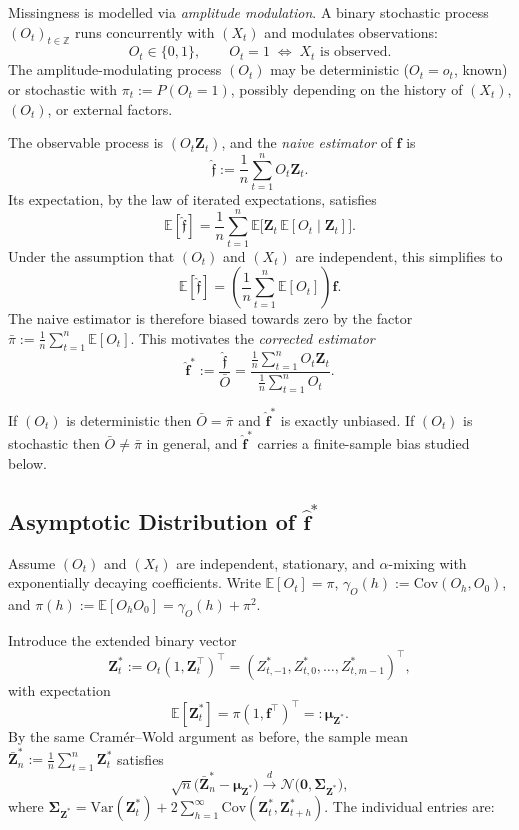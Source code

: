 \documentclass[12pt,a4paper]{scrreprt}
\begin{document}
Missingness is modelled via \emph{amplitude modulation}. A binary stochastic process
$(O_t)_{t \in \mathbb{Z}}$ runs concurrently with $(X_t)$ and modulates observations:
\[
    O_t \in \{0,1\}, \qquad O_t = 1 \;\Leftrightarrow\; X_t \text{ is observed}.
\]
The amplitude-modulating process $(O_t)$ may be deterministic ($O_t = o_t$, known) or
stochastic with $\pi_t := P(O_t = 1)$, possibly depending on the history of $(X_t)$, $(O_t)$,
or external factors.

The observable process is $(O_t\mathbf{Z}_t)$, and the \emph{naive estimator} of $\mathbf{f}$ is
\[
    \hat{\mathfrak{f}} := \frac{1}{n}\sum_{t=1}^{n} O_t\mathbf{Z}_t.
\]
Its expectation, by the law of iterated expectations, satisfies
\[
    \mathbb{E}[\hat{\mathfrak{f}}]
    = \frac{1}{n}\sum_{t=1}^{n} \mathbb{E}\bigl[\mathbf{Z}_t\,\mathbb{E}[O_t \mid \mathbf{Z}_t]\bigr].
\]
Under the assumption that $(O_t)$ and $(X_t)$ are independent, this simplifies to
\[
    \mathbb{E}[\hat{\mathfrak{f}}]
    = \left(\frac{1}{n}\sum_{t=1}^{n}\mathbb{E}[O_t]\right)\mathbf{f}.
\]
The naive estimator is therefore biased towards zero by the factor
$\bar{\pi} := \tfrac{1}{n}\sum_{t=1}^n \mathbb{E}[O_t]$. This motivates the \emph{corrected
estimator}
\[
    \hat{\mathbf{f}}^{*} := \frac{\hat{\mathfrak{f}}}{\bar{O}}
    = \frac{\tfrac{1}{n}\sum_{t=1}^{n} O_t\mathbf{Z}_t}{\tfrac{1}{n}\sum_{t=1}^{n}O_t}.
\]

If $(O_t)$ is deterministic then $\bar{O} = \bar{\pi}$ and $\hat{\mathbf{f}}^{*}$ is exactly
unbiased. If $(O_t)$ is stochastic then $\bar{O} \neq \bar{\pi}$ in general, and
$\hat{\mathbf{f}}^{*}$ carries a finite-sample bias studied below.

\subsection{Asymptotic Distribution of \texorpdfstring{$\hat{\mathbf{f}}^{*}$}{f*-hat}}

Assume $(O_t)$ and $(X_t)$ are independent, stationary, and $\alpha$-mixing with exponentially
decaying coefficients. Write $\mathbb{E}[O_t] = \pi$, $\gamma_O(h) := \mathrm{Cov}(O_h, O_0)$,
and $\pi(h) := \mathbb{E}[O_h O_0] = \gamma_O(h) + \pi^2$.

Introduce the extended binary vector
\[
    \mathbf{Z}_t^{*} := O_t(1, \mathbf{Z}_t^{\top})^{\top}
    = (Z_{t,-1}^{*}, Z_{t,0}^{*}, \ldots, Z_{t,m-1}^{*})^{\top},
\]
with expectation
\[
    \mathbb{E}[\mathbf{Z}_t^{*}]
    = \pi(1, \mathbf{f}^{\top})^{\top}
    =: \boldsymbol{\mu}_{\mathbf{Z}^{*}}.
\]
By the same Cramér–Wold argument as before, the sample mean
$\bar{\mathbf{Z}}_n^{*} := \tfrac{1}{n}\sum_{t=1}^n \mathbf{Z}_t^{*}$ satisfies
\[
    \sqrt{n}\bigl(\bar{\mathbf{Z}}_n^{*} - \boldsymbol{\mu}_{\mathbf{Z}^{*}}\bigr)
    \xrightarrow{d} \mathcal{N}\bigl(\mathbf{0}, \boldsymbol{\Sigma}_{\mathbf{Z}^{*}}\bigr),
\]
where $\boldsymbol{\Sigma}_{\mathbf{Z}^{*}} = \mathrm{Var}(\mathbf{Z}_t^{*}) + 2\sum_{h=1}^{\infty}\mathrm{Cov}(\mathbf{Z}_t^{*}, \mathbf{Z}_{t+h}^{*})$. The individual entries are:
\end{document}
